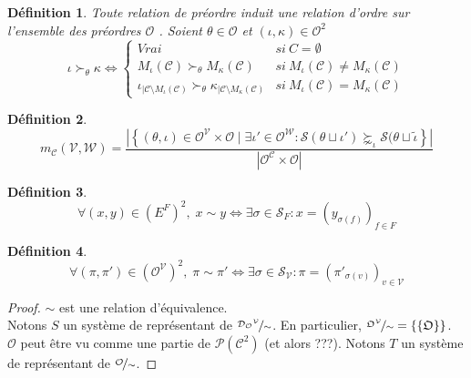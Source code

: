 \documentclass[french,11pt,a4paper]{article}
\newtheorem{definition}{Définition}
\newcommand{\mc}[1]{\ensuremath{\mathcal{#1}} }  %
\begin{document}
	\begin{definition}
		Toute relation de préordre induit une relation d'ordre sur l'ensemble des préordres \mc{O}. Soient $\theta \in \mc{O}$ et $(\iota, \kappa) \in \mc{O}^2$
		\begin{equation}
			\iota \succ_\theta \kappa \iff
			\left\{ \begin{matrix}
				Vrai &si \ C = \emptyset \\
				M_\iota(\mc{C}) \succ_\theta M_\kappa(\mc{C}) &si \ M_\iota(\mc{C}) \neq M_\kappa(\mc{C}) \\
				\iota_{|\mc{C} \setminus M_\iota(\mc{C})} \succ_\theta \kappa_{|\mc{C} \setminus M_\kappa(\mc{C})} &si \ M_\iota(\mc{C}) = M_\kappa(\mc{C})
			\end{matrix} \right.
		\end{equation}
	\end{definition}
	
	\begin{definition}
		\begin{equation}
			m_{\mc{C}} \left( \mc{V}, \mc{W} \right) =
			\frac{\left|\left\{ (\theta,\iota) \in \mc{O}^\mc{V} \times \mc{O} \;|\; \exists \iota' \in \mc{O}^\mc{W} : \mathscr{S} (\theta \sqcup \iota') \succnsim_\iota \mathscr{S}(\theta \sqcup \tilde{\iota} \right\}\right|}
			{\left| \mc{O}^\mc{C} \times \mc{O} \right|}
		\end{equation}
	\end{definition}
	
	\begin{definition}
		\begin{equation}
			\forall \left(x,y\right) \in \left(E^F\right)^2\!, \;
			x \sim y
			\iff \exists \sigma \in \mc{S}_F : x = \left(y_{\sigma(f)}\right)_{f \in F}
		\end{equation}
	\end{definition}
	
	\begin{definition}
		\begin{equation}
			\forall \left(\pi,\pi'\right) \in \left(\mc{O}^\mc{V}\right)^2\!, \;
			\pi \sim \pi'
			\iff \exists \sigma \in \mc{S}_\mc{V} : \pi = \left(\pi'_{\sigma(v)}\right)_{v \in \mc{V}}
		\end{equation}
	\end{definition}
	
	\begin{proof}
		$\sim$ est une relation d'équivalence. \\
		Notons $S$ un système de représentant de $\nicefrac{{\mc{D}_\mc{O}}^\mc{V}}{\sim}$. En particulier, $\nicefrac{\mathfrak{O}^\mc{V}}{\sim} = \{\{\mathfrak{O}\}\}$. \\
		\mc{O} peut être vu comme une partie de $\mc{P}(\mc{C}^2)$ (et alors ???). Notons $T$ un système de représentant de $\nicefrac{\mc{O}}{\sim}$.
	\end{proof}
	
\end{document}
